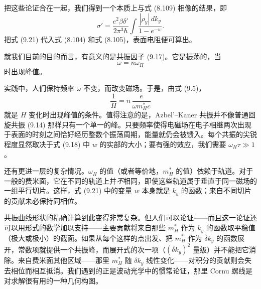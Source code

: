 把这些论证合在一起，我们得到一个本质上与式 (8.109) 相像的结果，即
\begin{equation*}
\sigma'=\frac{e^{2}\beta\delta'}{2\pi^{3}\hbar}\int\frac{|\rho_y|\,dk_y}{1-e^{-w}}. \tag{9.21}
\end{equation*}
把式 (9.21) 代入式 (8.104) 和式 (8.105)，表面电阻便可算出。

就我们目前的目的而言，有意义的是共振因子 (9.17)。它是振荡的，当
\begin{equation*}
\omega=n\omega_H \tag{9.22}
\end{equation*}
时出现峰值。

实践中，人们保持频率 $\omega$ 不变，而改变磁场。于是，由式 (9.5)，
\begin{equation*}
\frac{1}{H}=n\,\frac{e}{\omega m_H^{*}c} \tag{9.23}
\end{equation*}
就是 $H$ 变化时出现峰值的条件。值得注意的是，Azbel'–Kaner 共振并不像普通回旋共振 (9.14) 那样只有一个单一的峰。只要频率使得电磁场在电子相继两次出现于表面的时刻之间恰好经历整数个振荡周期，能量就仍会被馈入。每个共振的尖锐程度显然取决于式 (9.18) 中 $w$ 的实部的大小；要有强的效应，我们需要 $\omega_H\tau\gg 1$。

还有更进一层的复杂情况。$\omega_H$ 的值（或者等价地，$m_H^{*}$ 的值）依赖于轨道。对于一般的费米面，它在不同的轨道上并\emph{不}相同，即使这些轨道属于垂直于同一磁场的一组平行切片。这样，式 (9.21) 中的变量 $w$ 本身就是 $k_y$ 的函数；来自不同切片的贡献未必保持同相位。

共振曲线形状的精确计算到此变得非常复杂。但人们可以论证——而且这一论证还可以用形式的数学加以支持——主要贡献将来自那些 $m_H^{*}$ 作为 $k_y$ 的函数取平稳值（极大或极小）的截面。如果从每个这样的点出发、把 $m_H^{*}$ 作为 $\delta k_y$ 的函数展开，常数项就提供一个共振峰，而展开式的次一项（$(\delta k_y)^{2}$ 量级）并不能把它消除。来自费米面其他区域——那里 $m_H^{*}$ 随 $\delta k_y$ 线性变化——对积分的贡献则会失去相位而相互抵消。我们遇到的正是波动光学中的惯常论证，那里 Cornu 螺线是对求解很有用的一种几何构图。

